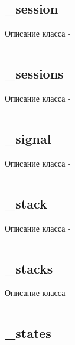 \documentclass[a4paper, 14pt]{extarticle}
\begin{document}
\subsection{{\color{orange} \_session}}

Описание класса  -
\begin{lstlisting}[numbers=none]

\end{lstlisting}

\subsection{{\color{orange} \_sessions}}

Описание класса  -
\begin{lstlisting}[numbers=none]

\end{lstlisting}

\subsection{{\color{orange} \_signal}}

Описание класса  -
\begin{lstlisting}[numbers=none]

\end{lstlisting}

\subsection{{\color{orange} \_stack}}

Описание класса  -
\begin{lstlisting}[numbers=none]

\end{lstlisting}

\subsection{{\color{orange} \_stacks}}

Описание класса  -
\begin{lstlisting}[numbers=none]

\end{lstlisting}

\subsection{{\color{orange} \_states}}
\end{document}
